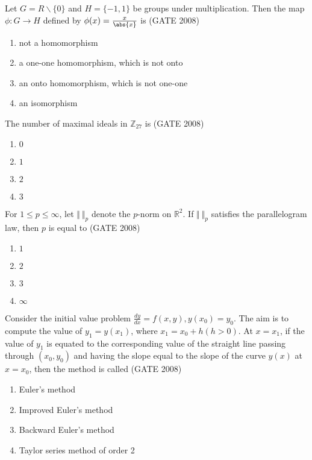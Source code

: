 \item{ Let $G = R \backslash \{0\}$ and $H=\{-1, 1\}$ be groups under multiplication. Then the map $\phi: G \rightarrow H$ defined by $\phi(x) = \frac{x}{\abs{x}}$ is \hfill (GATE 2008)
\begin{enumerate}
    \item not a homomorphism
    \item a one-one homomorphism, which is not onto 
    \item an onto homomorphism, which is not one-one 
    \item an isomorphism
\end{enumerate}
}



\item {The number of maximal ideals in $\mathbb{Z}_{27}$ is   \hfill (GATE 2008)
\begin{multicols}{4}
    \begin{enumerate}
        \item $0$
        \item $1$
        \item $2$
        \item $3$
    \end{enumerate}
\end{multicols}
}

\item {For $1\leq p \leq\infty$, let $\Vert\:\Vert_p$ denote the $p$-norm on $\mathbb{R}^2$. If $\Vert\:\Vert_p$ satisfies the parallelogram law, then $p$ is equal to \hfill (GATE 2008)
\begin{multicols}{4}
    \begin{enumerate}
        \item $1$
        \item $2$
        \item $3$
        \item $\infty$
    \end{enumerate}
\end{multicols}
}

\item { Consider the initial value problem $\frac{dy}{dx} = f(x, y), y(x_0) = y_0$. The aim is to compute the value of $y_1 = y(x_1)$, where $x_1 = x_0 + h (h>0)$. At $x=x_1$, if the value of $y_1$ is equated to the corresponding value of the straight line passing through $(x_0, y_0)$ and having the slope equal to the slope of the curve $y(x)$ at $x = x_0$, then the method is called  \hfill (GATE 2008)

\begin{multicols}{2}
\begin{enumerate}
    \item Euler's method
    \item Improved Euler's method
    \item Backward Euler's method
    \item Taylor series method of order 2
\end{enumerate}
\end{multicols}
}

